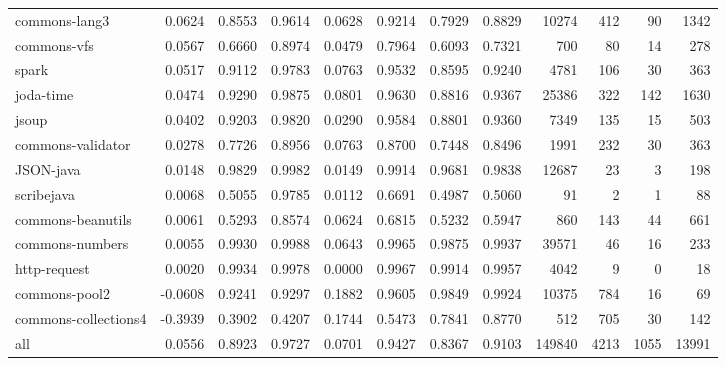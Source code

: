 \begin{table*}
\begin{tabular}{lrrrrrrrrrrr}
          commons-lang3 &      0.0624 &  0.8553 &     0.9614 &     0.0628 &  0.9214 &     0.7929 &   0.8829 &   10274 &   412 &    90 &   1342 \\
            commons-vfs &      0.0567 &  0.6660 &     0.8974 &     0.0479 &  0.7964 &     0.6093 &   0.7321 &     700 &    80 &    14 &    278 \\
                  spark &      0.0517 &  0.9112 &     0.9783 &     0.0763 &  0.9532 &     0.8595 &   0.9240 &    4781 &   106 &    30 &    363 \\
              joda-time &      0.0474 &  0.9290 &     0.9875 &     0.0801 &  0.9630 &     0.8816 &   0.9367 &   25386 &   322 &   142 &   1630 \\
                  jsoup &      0.0402 &  0.9203 &     0.9820 &     0.0290 &  0.9584 &     0.8801 &   0.9360 &    7349 &   135 &    15 &    503 \\
      commons-validator &      0.0278 &  0.7726 &     0.8956 &     0.0763 &  0.8700 &     0.7448 &   0.8496 &    1991 &   232 &    30 &    363 \\
              JSON-java &      0.0148 &  0.9829 &     0.9982 &     0.0149 &  0.9914 &     0.9681 &   0.9838 &   12687 &    23 &     3 &    198 \\
             scribejava &      0.0068 &  0.5055 &     0.9785 &     0.0112 &  0.6691 &     0.4987 &   0.5060 &      91 &     2 &     1 &     88 \\
      commons-beanutils &      0.0061 &  0.5293 &     0.8574 &     0.0624 &  0.6815 &     0.5232 &   0.5947 &     860 &   143 &    44 &    661 \\
        commons-numbers &      0.0055 &  0.9930 &     0.9988 &     0.0643 &  0.9965 &     0.9875 &   0.9937 &   39571 &    46 &    16 &    233 \\
           http-request &      0.0020 &  0.9934 &     0.9978 &     0.0000 &  0.9967 &     0.9914 &   0.9957 &    4042 &     9 &     0 &     18 \\
          commons-pool2 &     -0.0608 &  0.9241 &     0.9297 &     0.1882 &  0.9605 &     0.9849 &   0.9924 &   10375 &   784 &    16 &     69 \\
   commons-collections4 &     -0.3939 &  0.3902 &     0.4207 &     0.1744 &  0.5473 &     0.7841 &   0.8770 &     512 &   705 &    30 &    142 \\
                    all &      0.0556 &  0.8923 &     0.9727 &     0.0701 &  0.9427 &     0.8367 &   0.9103 &  149840 &  4213 &  1055 &  13991 \\
\bottomrule
\end{tabular}
\end{table*}
